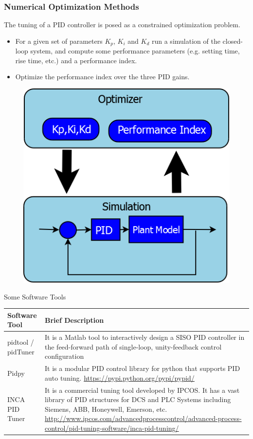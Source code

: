 \begin{frame}
	\small{
	\frametitle{Numerical Optimization Methods}
	The tuning of a PID controller is posed as a constrained optimization problem.  
	\begin{itemize}
			\item For a given set of parameters $K_p$, $K_i$ and $K_d$ run a simulation of the closed-loop system, and compute some performance parameters (e.g. setting time, rise time, etc.) and a performance index.
			\item Optimize the performance index over the three PID gains.
	\end{itemize}}
	\begin{figure}
	\includegraphics[width=0.3\linewidth]{img/PID_1}
	\end{figure}	
\end{frame}

\begin{frame}{Some Software Tools}
	\small{
	\begin{tabular}{|p{3cm}|p{7cm}|}
		\hline Software Tool  & Brief Description  \\ 
		\hline pidtool / pidTuner
		 & It is a Matlab tool to interactively design a SISO PID controller in the feed-forward path of single-loop, unity-feedback control configuration \\ 
		\hline Pidpy
		 & It is a modular PID control library for python that supports PID auto tuning. \url{https://pypi.python.org/pypi/pypid/}
		  \\ 
		\hline INCA PID Tuner
		 & It is a commercial tuning tool developed by IPCOS. It has a vast library of PID structures for DCS and PLC  Systems including Siemens, ABB, Honeywell, Emerson, etc. \url{http://www.ipcos.com/advancedprocesscontrol/advanced-process-control/pid-tuning-software/inca-pid-tuning/}
		   \\ 
		\hline 
	\end{tabular}}
\end{frame}

